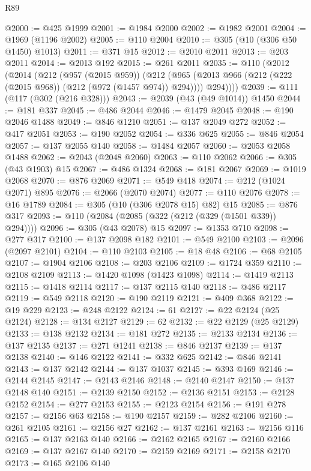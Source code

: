 \begin{lexlean}{R89}
\begin{coremodule}
@2000 := @425 @1999
@2001 := @1984 @2000
@2002 := @1982 @2001
@2004 := @1969 (@1196 @2002)
@2005 := @110 @2004
@2010 := @305 (@10 (@306 @50 @1450) @1013)
@2011 := @371 @15
@2012 := @2010 @2011
@2013 := @203 @2011
@2014 := @2013 @192
@2015 := @261 @2011
@2035 := @110
    (@2012
      (@2014
        (@212
          (@957 (@2015 @959))
          (@212
            (@965 (@2013 @966 (@212 (@222 (@2015 @968)) (@212 (@972 (@1457 @974)) @294))))
            @294))))
@2039 := @111 (@117 (@302 (@216 @328)))
@2043 := @2039 (@43 (@49 @1014)) @1450
@2044 := @181 @337
@2045 := @486 @2044
@2046 := @1479 @2045
@2048 := @190 @2046 @1488
@2049 := @846 @1210
@2051 := @137 @2049 @272
@2052 := @417 @2051
@2053 := @190 @2052
@2054 := @336 @625
@2055 := @846 @2054
@2057 := @137 @2055 @140
@2058 := @1484 @2057
@2060 := @2053 @2058 @1488
@2062 := @2043 (@2048 @2060)
@2063 := @110 @2062
@2066 := @305 (@43 @1903) @15
@2067 := @486 @1324
@2068 := @181 @2067
@2069 := @1019 @2068
@2070 := @876 @2069
@2071 := @549 @418
@2074 := @212 (@1024 @2071) @895
@2076 := @2066 (@2070 @2074)
@2077 := @110 @2076
@2078 := @16 @1789
@2084 := @305 (@10 (@306 @2078 @15) @82) @15
@2085 := @876 @317
@2093 := @110 (@2084 (@2085 (@322 (@212 (@329 (@1501 @339)) @294))))
@2096 := @305 (@43 @2078) @15
@2097 := @1353 @710
@2098 := @277 @317
@2100 := @137 @2098 @182
@2101 := @549 @2100
@2103 := @2096 (@2097 @2101)
@2104 := @110 @2103
@2105 := @18 @48
@2106 := @68 @2105
@2107 := @1904 @2106
@2108 := @203 @2106
@2109 := @1724 @359
@2110 := @2108 @2109
@2113 := @1420 @1098 (@1423 @1098)
@2114 := @1419 @2113
@2115 := @1418 @2114
@2117 := @137 @2115 @140
@2118 := @486 @2117
@2119 := @549 @2118
@2120 := @190 @2119
@2121 := @409 @368
@2122 := @19 @229
@2123 := @248 @2122
@2124 := 61
@2127 := @22 @2124 (@25 @2124)
@2128 := @134 @2127
@2129 := 62
@2132 := @22 @2129 (@25 @2129)
@2133 := @138 @2132
@2134 := @181 @272
@2135 := @2133 @2134
@2136 := @137 @2135
@2137 := @271 @1241
@2138 := @846 @2137
@2139 := @137 @2138
@2140 := @146 @2122
@2141 := @332 @625
@2142 := @846 @2141
@2143 := @137 @2142
@2144 := @137 @1037
@2145 := @393 @169
@2146 := @2144 @2145
@2147 := @2143 @2146
@2148 := @2140 @2147
@2150 := @137 @2148 @140
@2151 := @2139 @2150
@2152 := @2136 @2151
@2153 := @2128 @2152
@2154 := @277 @2153
@2155 := @2123 @2154
@2156 := @191 @278
@2157 := @2156 @63
@2158 := @190 @2157
@2159 := @282 @2106
@2160 := @261 @2105
@2161 := @2156 @27
@2162 := @137 @2161
@2163 := @2156 @116
@2165 := @137 @2163 @140
@2166 := @2162 @2165
@2167 := @2160 @2166
@2169 := @137 @2167 @140
@2170 := @2159 @2169
@2171 := @2158 @2170
@2173 := @165 @2106 @140

\end{coremodule}
\end{lexlean}
